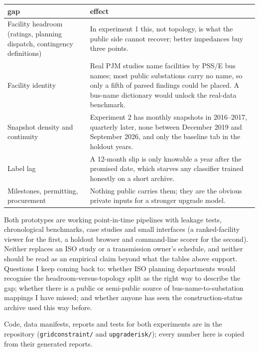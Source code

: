 \documentclass[11pt,a4paper]{article}
\begin{document}
\begin{center}
\small
\begin{tabular}{p{}p{}}
\toprule
gap & effect \\
\midrule
Facility headroom (ratings, planning dispatch, contingency definitions) & In experiment 1 this, not topology, is what the public side cannot recover; better impedances buy three points. \\
Facility identity & Real PJM studies name facilities by PSS/E bus names; most public substations carry no name, so only a fifth of parsed findings could be placed. A bus-name dictionary would unlock the real-data benchmark. \\
Snapshot density and continuity & Experiment 2 has monthly snapshots in 2016--2017, quarterly later, none between December 2019 and September 2026, and only the baseline tab in the holdout years. \\
Label lag & A 12-month slip is only knowable a year after the promised date, which starves any classifier trained honestly on a short archive. \\
Milestones, permitting, procurement & Nothing public carries them; they are the obvious private inputs for a stronger upgrade model. \\
\bottomrule
\end{tabular}
\end{center}

Both prototypes are working point-in-time pipelines with leakage tests, chronological benchmarks, case studies and
small interfaces (a ranked-facility viewer for the first, a holdout browser and command-line scorer for the second).
Neither replaces an ISO study or a transmission owner's schedule, and neither should be read as an empirical claim beyond
what the tables above support. Questions I keep coming back to: whether ISO planning departments would recognise the
headroom-versus-topology split as the right way to describe the gap; whether there is a public or semi-public source of
bus-name-to-substation mappings I have missed; and whether anyone has seen the construction-status archive used this way
before.

\vspace{6pt}
{\small\color{ink2} Code, data manifests, reports and tests for both experiments are in the repository (\texttt{gridconstraint/} and \texttt{upgraderisk/}); every number here is copied from their generated reports.}
\end{document}
